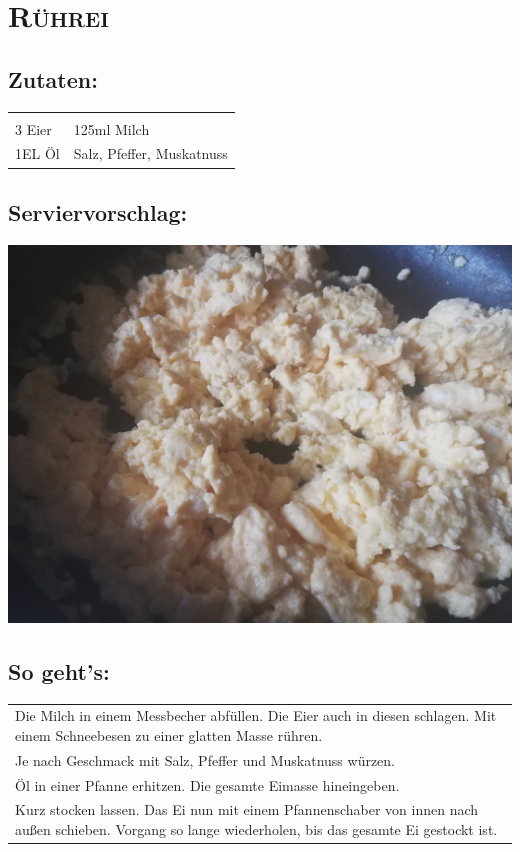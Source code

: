 \section{\textsc{Rührei}}

\subsection*{Zutaten:}

\begin{tabular}{p{7.5cm} p{7.5cm}}
	& \\
	3 Eier & 125ml Milch \\
	1EL Öl & Salz, Pfeffer, Muskatnuss
\end{tabular}

\subsection*{Serviervorschlag:}

\includegraphics[width=\textwidth]{img/ruehrei/ruehrei_fertig.jpg}

\subsection*{So geht's:}

\begin{tabular}{p{15cm}}
	\\
	Die Milch in einem Messbecher abfüllen. Die Eier auch in diesen schlagen. Mit einem Schneebesen zu einer glatten Masse rühren.\\
	Je nach Geschmack mit Salz, Pfeffer und Muskatnuss würzen.\\
	Öl in einer Pfanne erhitzen. Die gesamte Eimasse hineingeben.\\
	Kurz stocken lassen. Das Ei nun mit einem Pfannenschaber von innen nach außen schieben. Vorgang so lange wiederholen, bis das gesamte Ei gestockt ist.
\end{tabular}